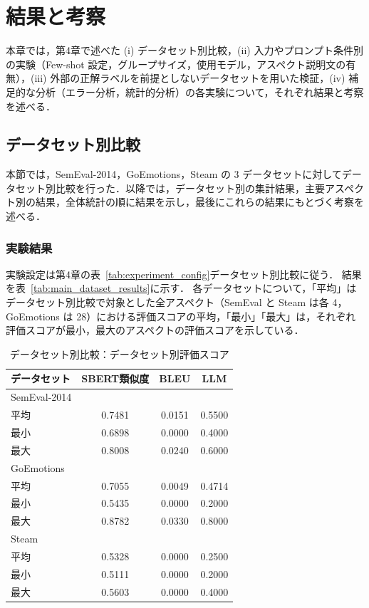 \chapter{結果と考察}

本章では，第4章で述べた (i) データセット別比較，(ii) 入力やプロンプト条件別の実験（Few-shot 設定，グループサイズ，使用モデル，アスペクト説明文の有無），(iii) 外部の正解ラベルを前提としないデータセットを用いた検証，(iv) 補足的な分析（エラー分析，統計的分析）の各実験について，それぞれ結果と考察を述べる．

\section{データセット別比較}
\noindent
本節では，SemEval-2014，GoEmotions，Steam の 3 データセットに対してデータセット別比較を行った．以降では，データセット別の集計結果，主要アスペクト別の結果，全体統計の順に結果を示し，最後にこれらの結果にもとづく考察を述べる．
\subsection{実験結果}
実験設定は第4章の表~\ref{tab:experiment_config}データセット別比較に従う．
結果を表~\ref{tab:main_dataset_results}に示す．
各データセットについて，「平均」はデータセット別比較で対象とした全アスペクト（SemEval と Steam は各 4，GoEmotions は 28）における評価スコアの平均，「最小」「最大」は，それぞれ評価スコアが最小，最大のアスペクトの評価スコアを示している．
\begin{table}[htbp]
  \centering
  \caption{データセット別比較：データセット別評価スコア}
  \label{tab:main_dataset_results}
  \label{tab:concreteness_comparison}
  \begin{tabular}{lccc}
    \toprule
    データセット & SBERT類似度 & BLEU & LLM \\
    \midrule
    SemEval-2014 & & & \\
    \quad 平均 & 0.7481 & 0.0151 & 0.5500 \\
    \quad 最小 & 0.6898 & 0.0000 & 0.4000 \\
    \quad 最大 & 0.8008 & 0.0240 & 0.6000 \\
    \midrule
    GoEmotions & & & \\
    \quad 平均 & 0.7055 & 0.0049 & 0.4714 \\
    \quad 最小 & 0.5435 & 0.0000 & 0.2000 \\
    \quad 最大 & 0.8782 & 0.0330 & 0.8000 \\
    \midrule
    Steam & & & \\
    \quad 平均 & 0.5328 & 0.0000 & 0.2500 \\
    \quad 最小 & 0.5111 & 0.0000 & 0.2000 \\
    \quad 最大 & 0.5603 & 0.0000 & 0.4000 \\
    \bottomrule
  \end{tabular}
\end{table}

